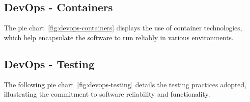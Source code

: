 \subsection{DevOps - Containers}

The pie chart~\ref{fig:devops-containers} displays the use of container technologies, which help encapsulate the software to run reliably in various environments.


\subsection{DevOps - Testing}

The following pie chart~\ref{fig:devops-testing} details the testing practices adopted, illustrating the commitment to software reliability and functionality.



